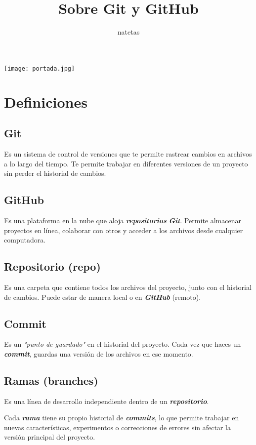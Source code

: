 \documentclass[10pt,a4paper]{book}
\author{natetas}
\title{Sobre Git y GitHub}
\date{}
\begin{document}
\maketitle

\tableofcontents
\newpage
\begin{center}
	\texttt{[image: portada.jpg]}  
\end{center}
\newpage
\chapter{Definiciones}
\newpage
\section{Git}
Es un sistema de control de versiones que te permite rastrear cambios en archivos a lo largo del tiempo. Te permite trabajar en diferentes versiones de un proyecto sin perder el historial de cambios.
\section{GitHub}
Es una plataforma en la nube que aloja \textbf{\textit{repositorios}} \textbf{\textit{Git}}. Permite almacenar proyectos en línea, colaborar con otros y acceder a los archivos desde cualquier computadora.
\section{Repositorio (repo)}
Es una carpeta que contiene todos los archivos del proyecto, junto con el historial de cambios. Puede estar de manera local o en \textbf{\textit{GitHub}} (remoto).
\section{Commit}
Es un \textit{"punto de guardado"} en el historial del proyecto. Cada vez que haces un \textbf{\textit{commit}}, guardas una versión de los archivos en ese momento.
\section{Ramas (branches)}
Es una línea de desarrollo independiente dentro de un \textbf{\textit{repositorio}}.

Cada \textbf{\textit{rama}} tiene su propio historial de \textbf{\textit{commits}}, lo que permite trabajar en nuevas características, experimentos o correcciones de errores sin afectar la versión principal del proyecto.
\end{document}
